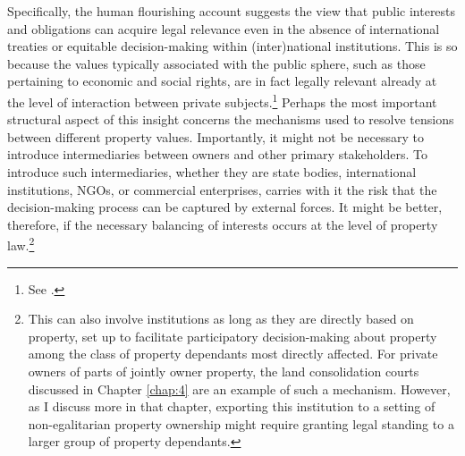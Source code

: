 Specifically, the human flourishing account suggests the view that public interests and obligations can acquire legal relevance even in the absence of international treaties or equitable decision-making within (inter)national institutions. This is so because the values typically associated with the public sphere, such as those pertaining to economic and social rights, are in fact legally relevant already at the level of interaction between private subjects.\footnote{See \cite[1295-1296]{alexander14}.}  Perhaps the most important structural aspect of this insight concerns the mechanisms used to resolve tensions between different property values. Importantly, it might not be necessary to introduce intermediaries between owners and other primary stakeholders. To introduce such intermediaries, whether they are state bodies, international institutions, NGOs, or commercial enterprises, carries with it the risk that the decision-making process can be captured by external forces. It might be better, therefore, if the necessary balancing of interests occurs at the level of property law.\footnote{This can also involve institutions as long as they are directly based on property, set up to facilitate participatory decision-making about property among the class of property dependants most directly affected. For private owners of parts of jointly owner property, the land consolidation courts discussed in Chapter \ref{chap:4} are an example of such a mechanism. However, as I discuss more in that chapter, exporting this institution to a setting of non-egalitarian property ownership might require granting legal standing to a larger group of property dependants.}


